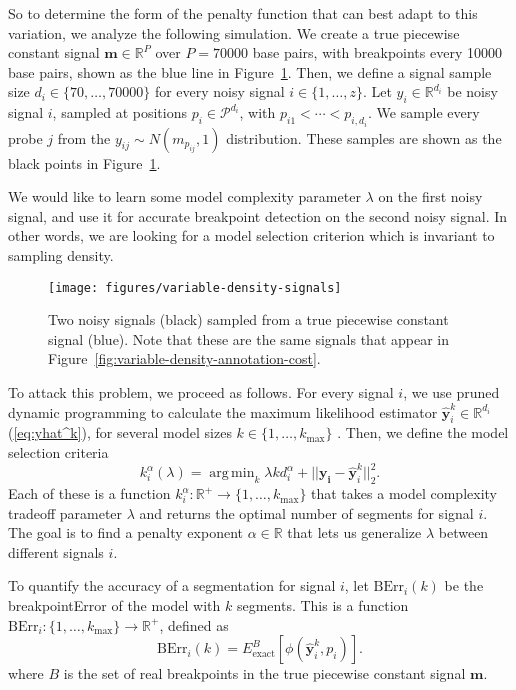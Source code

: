 \documentclass{jsfds} %
\DeclareMathOperator*{\argmin}{arg\,min}
\newcommand{\RR}{\mathbb{R}}
\begin{document}
So to determine the form of the penalty function that can best adapt
to this variation, we analyze the following simulation. We create a
true piecewise constant signal $\mathbf m\in\RR^P$ over $P=70000$ base
pairs, with breakpoints every 10000 base pairs, shown as the blue line
in Figure~\ref{fig:variable-density-signals}. Then, we define a signal
sample size $d_i\in\{70,\dots,70000\}$ for every noisy signal
$i\in\{1,\dots,z\}$. Let $y_i\in\RR^{d_i}$ be noisy signal $i$,
sampled at positions $p_i\in\mathcal P^{d_i}$, with
$p_{i1}<\cdots<p_{i,d_i}$. We sample every probe $j$ from the
$y_{ij}\sim N(m_{p_{ij}},1)$ distribution. These samples are shown as
the black points in Figure~\ref{fig:variable-density-signals}.

We would like to learn some model complexity parameter $\lambda$ on
the first noisy signal, and use it for accurate breakpoint detection
on the second noisy signal. In other words, we are looking for a model
selection criterion which is invariant to sampling density. 

\begin{figure}[H]
\texttt{[image: figures/variable-density-signals]}
%
\vskip -0.3cm
  \caption{Two noisy signals (black) sampled from
  a true piecewise constant signal (blue). Note that these are the
  same signals that appear in
  Figure~\ref{fig:variable-density-annotation-cost}.}
\label{fig:variable-density-signals}
\end{figure}

\newpage


To attack this problem, we proceed as follows. For every signal $i$,
we use pruned dynamic programming to calculate the maximum likelihood
estimator $\mathbf{\hat y}^k_i\in\RR^{d_i}$ (\ref{eq:yhat^k}), for several model sizes
$k\in\{1,\dots,k_{\text{max}}\}$ \citep{pruned-dp}. Then, we define
the model selection criteria
\begin{equation}
  \label{eq:kstar_density}
  k^\alpha_i(\lambda) =\argmin_k \lambda k d_i^\alpha + 
  ||\mathbf{y_i}-\mathbf{\hat y}^k_i||_2^2.
\end{equation}
Each of these is a function $k_i^\alpha:\RR^+\rightarrow
\{1,\dots,k_{\text{max}}\}$ that takes a model complexity tradeoff
parameter $\lambda$ and returns the optimal number of segments for
signal $i$. The goal is to find a penalty exponent $\alpha\in\RR$ that
lets us generalize $\lambda$ between different signals $i$.


To quantify the accuracy of a segmentation for signal $i$, let
$\text{BErr}_i(k)$ be the breakpointError of the model with
$k$ segments. This is a function
$\text{BErr}_i:\{1,\dots,k_{\text{max}}\}\rightarrow\RR^+$, defined as
\begin{equation}
  \label{eq:berr}
  \text{BErr}_i(k) = E_{\text{exact}}^{B}\left[
\phi(\mathbf{\hat y}_i^k,p_i)
\right].
\end{equation}
where $B$ is the set of real breakpoints in the true piecewise constant
signal $\mathbf m$.
\end{document}

